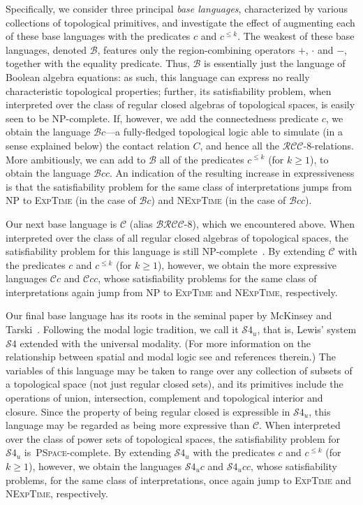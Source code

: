 \documentclass{LMCS}
\theoremstyle{plain}
\newcommand{\cB}{\ensuremath{\mathcal{B}}}\newcommand{\cBc}{\ensuremath{\mathcal{B}c}}\newcommand{\cBcc}{\ensuremath{\mathcal{B}cc}}
\newcommand{\cBC}{\ensuremath{\mathcal{C}}}
\newcommand{\cBCc}{\ensuremath{\cBC{}c}} \newcommand{\cBCcc}{\ensuremath{\cBC{}cc}}
\newcommand{\SF}{\ensuremath{\mathcal{S}4}}\newcommand{\SFU}{\ensuremath{\mathcal{S}4_u}}\newcommand{\conT}{\ensuremath{\SFU{}c}}\newcommand{\conTc}{\ensuremath{\SFU{}cc}}
\newcommand{\BRCCE}{\ensuremath{\mathcal{BRCC}\text{-}8}}
\newcommand{\RCCE}{\ensuremath{\mathcal{RCC}\text{-}8}}\newcommand{\RCCEcc}{\ensuremath{\RCCE{}cc}}\newcommand{\RCCEc}{\ensuremath{\RCCE{}c}}
\newcommand{\NP}{\textsc{NP}}
\newcommand{\PSpace}{\textsc{PSpace}}
\newcommand{\ExpTime}{\textsc{ExpTime}}
\newcommand{\NExpTime}{\textsc{NExpTime}}
\begin{document}
Specifically, we consider three principal \emph{base languages},
characterized by various collections of topological primitives, and
investigate the effect of augmenting each of these base languages with
the predicates $c$ and $c^{\le k}$.  The weakest of these base
languages, denoted $\cB$, features only the region-combining operators
$+$, $\cdot$ and $-$, together with the equality predicate. Thus,
$\cB$ is essentially just the language of Boolean algebra equations:
as such, this language can express no really characteristic
topological properties; further, its satisfiability problem, when
interpreted over the class of regular closed algebras of topological
spaces, is easily seen to be \NP-complete.  If, however, we add the
connectedness predicate $c$, we obtain the language $\cBc$---a
fully-fledged topological logic able to simulate (in a sense explained
below) the contact relation $C$, and hence all the
$\RCCE$-relations. More ambitiously, we can add to $\cB$ all of the
predicates $c^{\le k}$ (for $k \geq 1$), to obtain the language
$\cBcc$. An indication of the resulting increase in expressiveness is
that the satisfiability problem for the same class of interpretations
jumps from \NP{} to \ExpTime{} (in the case of $\cBc$) and \NExpTime{}
(in the case of $\cBcc$).

Our next base language is $\cBC$ (alias $\BRCCE$), which we
encountered above.  When interpreted over the class of all regular
closed algebras of topological spaces, the satisfiability problem for
this language is still NP-complete~\cite{Wolter&Z00ecai}.  By
extending $\cBC$ with the predicates $c$ and $c^{\le k}$ (for $k
\geq1$), however, we obtain the more expressive languages $\cBCc$ and
$\cBCcc$, whose satisfiability problems for the same class of
interpretations again jump from \NP{} to \ExpTime{} and \NExpTime{},
respectively.

Our final base language has its roots in the seminal paper by McKinsey
and Tarski~\cite{McKinsey&Tarski44}.  Following the modal logic
tradition, we call it $\SFU$, that is, Lewis' system $\SF$ extended
with the universal modality. (For more information on the relationship
between spatial and modal logic see
\cite{Benthem&Guram07hb,Gabelaiaetal05} and references therein.)  The
variables of this language may be taken to range over any collection
of subsets of a topological space (not just regular closed sets), and
its primitives include the operations of union, intersection,
complement and topological interior and closure. Since the property of
being regular closed is expressible in $\SFU$, this language may be
regarded as being more expressive than $\cBC$.  When interpreted over
the class of power sets of topological spaces, the satisfiability
problem for $\SFU$ is~\PSpace{}-complete.  By extending $\SFU$ with
the predicates $c$ and $c^{\le k}$ (for $k \geq 1$), however, we
obtain the languages $\conT$ and $\conTc$, whose satisfiability
problems, for the same class of interpretations, once again jump to
\ExpTime{} and \NExpTime{}, respectively.
\end{document}
